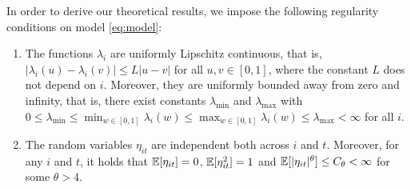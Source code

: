 \documentclass[a4paper,12pt]{article}
\numberwithin{equation}{section}
\begin{document}
In order to derive our theoretical results, we impose the following regularity conditions on model \eqref{eq:model}:
\begin{enumerate}[label=(C\arabic*),leftmargin=1.0cm]
\item \label{C2} The functions $\lambda_i$ are uniformly Lipschitz continuous, that is, $|\lambda_i(u) - \lambda_i(v)| \le L |u-v|$ for all $u, v \in [0,1]$, where the constant $L$ does not depend on $i$. Moreover, they are uniformly bounded away from zero and infinity, that is, there exist constants $\lambda_{\min}$ and $\lambda_{\max}$ with $0 \le \lambda_{\min} \le \min_{w \in [0,1]} \lambda_i(w) \le \max_{w \in [0,1]} \lambda_i(w) \le \lambda_{\max} < \infty$ for all $i$. 
\item \label{C1} The random variables $\eta_{it}$ are independent both across $i$ and $t$. Moreover, for any $i$ and $t$, it holds that $\mathbb{E}[\eta_{it}] = 0$, $\mathbb{E}[\eta_{it}^2] = 1$ and $\mathbb{E}[|\eta_{it}|^\theta] \le C_\theta < \infty$ for some $\theta > 4$. 
\end{enumerate}
\end{document}
